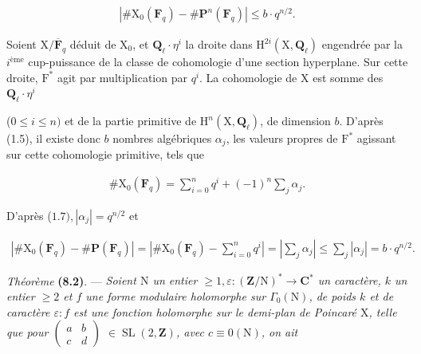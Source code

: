 \documentclass[10pt,leqno]{article}
\begin{document}
\begin{equation*}\begin{gathered}|\# \mathrm{X}_{0}(\mathbf{F}_{q})- \# \mathbf{P}^{n}(\mathbf{F}_{q})| \leq  b\cdot q^{n/2}.\end{gathered}\end{equation*}

\noindent Soient \(\mathrm{X}/\overline{\mathbf{F}}_{q}\) déduit de \(\mathrm{X}_{0}\), et \(\mathbf{Q}_{\ell }\cdot \eta ^{i}\) la droite dans \(\mathrm{H}^{2i}(\mathrm{X},\mathbf{Q}_{\ell })\) engendrée par la \(i^{\mathrm{ème}}\) cup-puissance de la classe de cohomologie d’une section hyperplane. Sur cette droite, \(\mathrm{F}^{*}\) agit par multiplication par \(q^{i}\). La cohomologie de \(\mathrm{X}\) est somme des \(\mathbf{Q}_{\ell }\cdot \eta ^{i}\)\par

\clearpage

\label{physical-31}

\noindent (\(0 \leq  i \leq  n)\) et de la partie primitive de \(\mathrm{H}^{n}(\mathrm{X}, \mathbf{Q}_{\ell })\), de dimension \(b\). D'après (1.5), il existe donc \(b\) nombres algébriques \(\alpha _{j}\), les valeurs propres de \(\mathrm{F}^{*}\) agissant sur cette cohomologie primitive, tels que\par

\begin{equation*}\begin{gathered}\# \mathrm{X}_{0}(\mathbf{F}_{q}) = \sum _{i=0}^{n} q^{i} + (-1)^{n} \sum _{j} \alpha _{j}.\end{gathered}\end{equation*}

\noindent D'après (\(1.7), |\alpha _{j}| = q^{n/2}\) et\par

\begin{equation*}\begin{gathered}|\# \mathrm{X}_{0}(\mathbf{F}_{q}) - \# \mathbf{P}(\mathbf{F}_{q})| = |\# \mathrm{X}_{0}(\mathbf{F}_{q}) - \sum _{i=0}^{n} q^{i}| = |\sum _{j} \alpha _{j}| \leq  \sum _{j} |\alpha _{j}| = b\cdot q^{n/2}.\end{gathered}\end{equation*}

\noindent \emph{Théorème} \textbf{(8.2)}. — {\itshape Soient \(\mathrm{N}\) un entier \(\geq  1, \varepsilon  : (\mathbf{Z}/\mathrm{N})^{*} \longrightarrow  \mathbf{C}^{*}\) un caractère, \(k\) un entier \(\geq  2\) et \(f\) une forme modulaire holomorphe sur \(\Gamma _{0}(\mathrm{N})\), de poids \(k\) et de caractère \(\varepsilon  : f\) est une fonction holomorphe sur le demi-plan de Poincaré \(\mathrm{X}\), telle que pour \(\begin{pmatrix}a&b\\c&d\end{pmatrix}\) \(\in  \operatorname{SL}(2, \mathbf{Z})\), avec \(c \equiv  0 (\mathrm{N})\), on ait}\par
\end{document}
